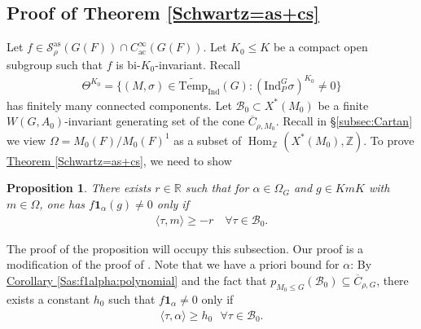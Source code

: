\documentclass[10pt]{amsart}
\newtheorem{proposition}[theorem]{Proposition}
\theoremstyle{definition}
\numberwithin{equation}{section}
\DeclareMathOperator{\Hom}{\mathrm{Hom}}
\numberwithin{equation}{subsection}
\newcommand{\Ind}{\mathrm{Ind}}
\newcommand{\ZZ}{\mathbb{Z}}
\newcommand{\RR}{\mathbb{R}}
\newcommand{\calB}{\mathcal{B}}
\newcommand{\Temp}{\mathrm{Temp}}
\begin{document}
\subsection{Proof of Theorem \ref{Schwartz=as+cs}}\label{ssec:Supportproof}
 


Let $f\in\mathcal{S}_{\rho}^{\mathrm{as}}(G(F))\cap  C^\infty_{\mathrm{ac}}(G(F)).$ Let $K_0\le K$ be a compact open subgroup such that $f$ is bi-$K_0$-invariant. Recall 
\begin{align*}
    \Theta^{K_0} = \{(M,\sigma)\in\widetilde{\Temp}_\Ind(G): (\Ind_P^G\sigma)^{K_0}\neq 0\}
\end{align*}
has finitely many connected components. Let $\mathcal{B}_0\subset X^*(M_0)$ be a finite $W(G,A_0)$-invariant generating set of the cone $\overline{C}_{\rho,M_0}$. Recall in \S\ref{subsec:Cartan} we view $\Omega=M_0(F)/M_0(F)^1$ as a subset of $\Hom_\ZZ(X^*(M_0),\ZZ)$. To prove \hyperref[Schwartz=as+cs]{Theorem \ref{Schwartz=as+cs}}, we need to show


\begin{proposition}\label{prop:key} There exists $r\in \RR$ such that for $\alpha\in\Omega_G$ and $g\in KmK$ with $m\in\Omega$, one has $f\mathbf{1}_\alpha(g)\neq 0$ only if
\begin{align*}
   \langle \tau ,m\rangle\ge -r\quad \forall\tau\in \calB_0.
\end{align*}
\end{proposition}

The proof of the proposition will occupy this subsection. Our proof is a modification of the proof of \cite[Proposition 2.1]{Heiermann:HeckePlan}. Note that we have a priori bound for $\alpha$: By \hyperref[Sas:f1alpha:polynomial]{Corollary \ref{Sas:f1alpha:polynomial}} and the fact that $p_{M_0\leq G}(\mathcal{B}_0)\subseteq \overline{C}_{\rho,G}$, there exists a constant $h_0$ such that $f\mathbf{1}_\alpha\neq 0$ only if
\begin{align}\label{support:alpha:bound}
    \langle\tau,\alpha\rangle\geq h_0\,\,\,\,\forall \tau\in\mathcal{B}_0.
\end{align}
\end{document}
